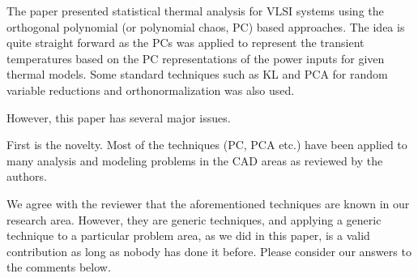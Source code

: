 \begin{reviewer}
The paper presented statistical thermal analysis for VLSI systems using the orthogonal polynomial  (or polynomial chaos, PC) based approaches. The idea is quite straight forward as the PCs was applied to represent the transient temperatures based on the PC representations of the power inputs for given thermal models. Some standard techniques such as KL and PCA for random variable reductions and orthonormalization was also used.

However, this paper has several major issues.

\vspace{0.5em}
\noindent[Comment 1] First is the novelty. Most of the techniques (PC, PCA etc.) have been applied to many analysis and modeling problems in the CAD areas as reviewed by the authors.
\end{reviewer}
\begin{authors}
We agree with the reviewer that the aforementioned techniques are known in our research area.
However, they are generic techniques, and applying a generic technique to a particular problem area, as we did in this paper, is a valid contribution as long as nobody has done it before.
Please consider our answers to the comments below.
\end{authors}

